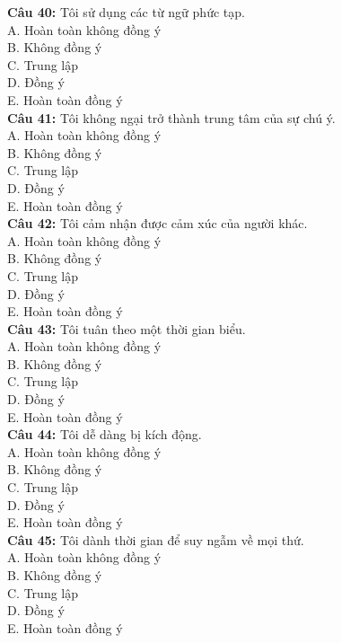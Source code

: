\begin{multicols}{2}
\textbf{Câu 40:} Tôi sử dụng các từ ngữ phức tạp. \\
A. Hoàn toàn không đồng ý \\
B. Không đồng ý \\
C. Trung lập \\
D. Đồng ý \\
E. Hoàn toàn đồng ý \\

\textbf{Câu 41:} Tôi không ngại trở thành trung tâm của sự chú ý. \\
A. Hoàn toàn không đồng ý \\
B. Không đồng ý \\
C. Trung lập \\
D. Đồng ý \\
E. Hoàn toàn đồng ý \\

\textbf{Câu 42:} Tôi cảm nhận được cảm xúc của người khác. \\
A. Hoàn toàn không đồng ý \\
B. Không đồng ý \\
C. Trung lập \\
D. Đồng ý \\
E. Hoàn toàn đồng ý \\

\textbf{Câu 43:} Tôi tuân theo một thời gian biểu. \\
A. Hoàn toàn không đồng ý \\
B. Không đồng ý \\
C. Trung lập \\
D. Đồng ý \\
E. Hoàn toàn đồng ý \\

\textbf{Câu 44:} Tôi dễ dàng bị kích động. \\
A. Hoàn toàn không đồng ý \\
B. Không đồng ý \\
C. Trung lập \\
D. Đồng ý \\
E. Hoàn toàn đồng ý \\

\textbf{Câu 45:} Tôi dành thời gian để suy ngẫm về mọi thứ. \\
A. Hoàn toàn không đồng ý \\
B. Không đồng ý \\
C. Trung lập \\
D. Đồng ý \\
E. Hoàn toàn đồng ý \\


\end{multicols}
